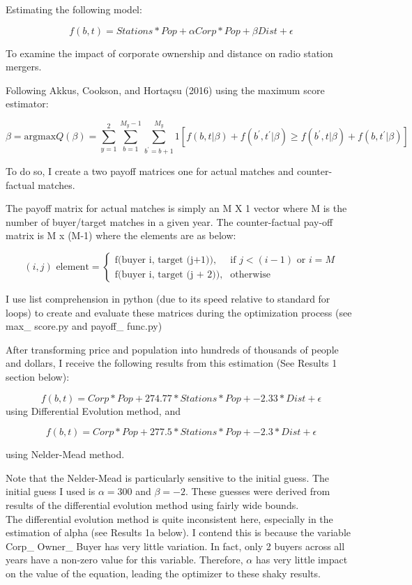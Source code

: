 \documentclass{article}
\begin{document}
Estimating the following model:

$$f(b, t) = Stations * Pop + \alpha Corp * Pop + \beta Dist  + \epsilon$$

To examine the impact of corporate ownership and distance on radio station mergers.

Following Akkus, Cookson, and Horta\c csu (2016) using the maximum score estimator:

$$\beta = \text{argmax} Q(\beta) = \sum_{y=1}^{2} \sum_{b = 1}^{M_y -1}\sum_{b^\prime = b+1}^{M_y} 1[f(b, t|\beta) + f(b^\prime, t^\prime|\beta) \geq f(b^\prime, t|\beta) + f(b, t^\prime|\beta)]$$

To do so, I create a two payoff matrices one for actual matches and counter-factual matches.

The payoff matrix for actual matches is simply an M X 1 vector where M is the number of buyer/target matches in a given year. The counter-factual pay-off matrix is M x (M-1) where the elements are as below:

$$(i, j) \text{ element} = \begin{cases} \text{f(buyer i, target (j+1))}, & \mbox{if } j < (i - 1) \text{ or } i = M\\ \text{f(buyer i, target (j + 2))}, & \text{otherwise} \end{cases}$$ 

I use list comprehension in python (due to its speed relative to standard for loops) to create and evaluate these matrices during the optimization process (see max\_ score.py and payoff\_ func.py)

After transforming price and population into hundreds of thousands of people and dollars, I receive the following results from this estimation (See Results 1 section below):

$$f(b, t) = Corp * Pop + 274.77 * Stations * Pop + -2.33 * Dist  + \epsilon$$
using Differential Evolution method, and

$$f(b, t) = Corp * Pop + 277.5 * Stations * Pop + -2.3 * Dist  + \epsilon$$

using Nelder-Mead method.
\newpage

Note that the Nelder-Mead is particularly sensitive to the initial guess. The initial guess I used is $\alpha = 300$ and $\beta = -2$. These guesses were derived from results of the differential evolution method using fairly wide bounds.\\


The differential evolution method is quite inconsistent here, especially in the estimation of alpha (see Results 1a below). I contend this is because the variable Corp\_ Owner\_ Buyer has very little variation. In fact, only 2 buyers across all years have a non-zero value for this variable. Therefore, $\alpha$ has very little impact on the value of the equation, leading the optimizer to these shaky results.\\
\end{document}
